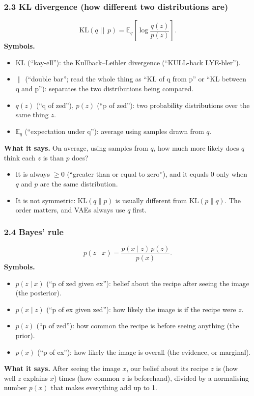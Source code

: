 \subsubsection*{2.3 KL divergence (how different two distributions are)}

\[
\mathrm{KL}(q \,\|\, p) = \mathbb{E}_{q}\!\left[ \log \frac{q(z)}{p(z)} \right].
\]
\textbf{Symbols.}
\begin{itemize}[leftmargin=1.5em, itemsep=0pt]
\item $\mathrm{KL}$ (``kay-ell''): the Kullback--Leibler divergence (``KULL-back LYE-bler'').
\item $\|$ (``double bar''; read the whole thing as ``KL of q from p'' or ``KL between q and p''): separates the two distributions being compared.
\item $q(z)$ (``q of zed''), $p(z)$ (``p of zed''): two probability distributions over the same thing $z$.
\item $\mathbb{E}_q$ (``expectation under q''): average using samples drawn from $q$.
\end{itemize}
\textbf{What it says.} On average, using samples from $q$, how much more likely does $q$ think each $z$ is than $p$ does?
\begin{itemize}[leftmargin=1.5em]
\item It is always $\ge 0$ (``greater than or equal to zero''), and it equals 0 only when $q$ and $p$ are the same distribution.
\item It is not symmetric: $\mathrm{KL}(q\|p)$ is usually different from $\mathrm{KL}(p\|q)$. The order matters, and VAEs always use $q$ first.
\end{itemize}

\subsubsection*{2.4 Bayes' rule}

\[
p(z \mid x) = \frac{p(x \mid z)\, p(z)}{p(x)}.
\]
\textbf{Symbols.}
\begin{itemize}[leftmargin=1.5em, itemsep=0pt]
\item $p(z \mid x)$ (``p of zed given ex''): belief about the recipe after seeing the image (the posterior).
\item $p(x \mid z)$ (``p of ex given zed''): how likely the image is if the recipe were $z$.
\item $p(z)$ (``p of zed''): how common the recipe is before seeing anything (the prior).
\item $p(x)$ (``p of ex''): how likely the image is overall (the evidence, or marginal).
\end{itemize}
\textbf{What it says.} After seeing the image $x$, our belief about its recipe $z$ is (how well $z$ explains $x$) times (how common $z$ is beforehand), divided by a normalising number $p(x)$ that makes everything add up to 1.


